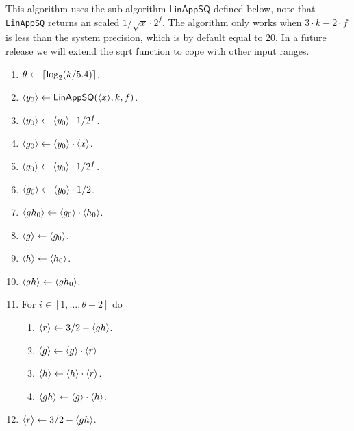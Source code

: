 This algorithm uses the sub-algorithm $\mathsf{LinAppSQ}$ defined below, note that \verb|LinAppSQ| returns an scaled $1/\sqrt{x} \cdot 2^{f}$.
The algorithm only works when $3 \cdot k -2 \cdot f$ is less than the system precision, which is by default equal to $20$.
In a future release we will extend the sqrt function to cope with other input ranges.
\begin{enumerate}
\item $\theta \leftarrow {\lceil \log_2 (k/5.4) \rceil}$.
\item $\langle y_0 \rangle \leftarrow \mathsf{LinAppSQ}(\langle x \rangle,k,f)$.
\item $\langle y_0 \rangle \leftarrow \langle y_0 \rangle \cdot 1/2^{f}$.
\item $\langle g_0 \rangle \leftarrow \langle y_0 \rangle \cdot \langle x \rangle$.
\item $\langle g_0 \rangle \leftarrow \langle y_0 \rangle \cdot 1/2^{f}$.
\item $\langle g_0 \rangle \leftarrow \langle y_0 \rangle \cdot 1/2$.
\item $\langle gh_0 \rangle \leftarrow \langle g_0 \rangle \cdot \langle h_0 \rangle$.
\item $\langle g \rangle \leftarrow \langle g_0 \rangle$.
\item $\langle h \rangle \leftarrow \langle h_0 \rangle$.
\item $\langle gh \rangle \leftarrow \langle gh_0 \rangle$.
\item For $i \in[1,\ldots,\theta-2]$ do
\begin{enumerate}
  \item $\langle r \rangle \leftarrow 3/2-\langle gh \rangle$.
  \item $\langle g \rangle \leftarrow \langle g \rangle \cdot \langle r \rangle$.
  \item $\langle h \rangle \leftarrow \langle h \rangle \cdot \langle r \rangle$.
  \item $\langle gh \rangle \leftarrow \langle g \rangle \cdot \langle h \rangle$.
\end{enumerate}
\item $\langle r \rangle \leftarrow 3/2-\langle gh \rangle$.

\end{enumerate}
